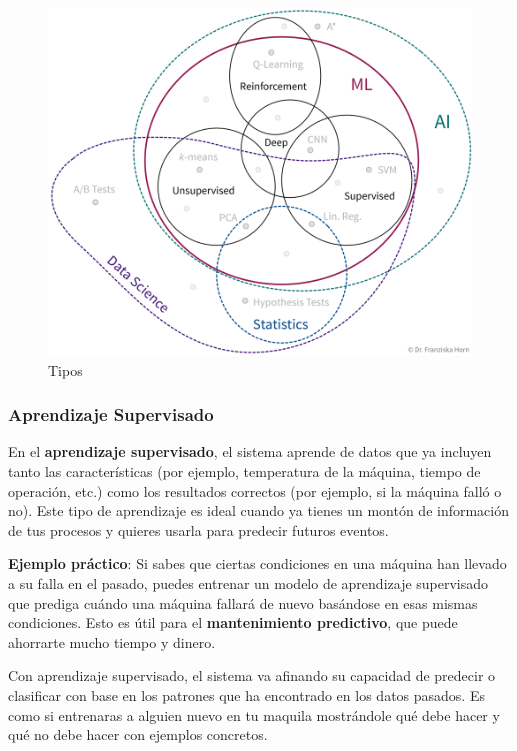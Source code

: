 \documentclass[
  10pt,
  letterpaper,
]{book}
\begin{document}
\begin{figure}[H]

{\centering \includegraphics{Img/imagen_21.jpg}

}

\caption{Tipos}

\end{figure}%

\subsubsection{\texorpdfstring{\textbf{Aprendizaje
Supervisado}}{Aprendizaje Supervisado}}\label{aprendizaje-supervisado-1}

En el \textbf{aprendizaje supervisado}, el sistema aprende de datos que
ya incluyen tanto las características (por ejemplo, temperatura de la
máquina, tiempo de operación, etc.) como los resultados correctos (por
ejemplo, si la máquina falló o no). Este tipo de aprendizaje es ideal
cuando ya tienes un montón de información de tus procesos y quieres
usarla para predecir futuros eventos.

\textbf{Ejemplo práctico}: Si sabes que ciertas condiciones en una
máquina han llevado a su falla en el pasado, puedes entrenar un modelo
de aprendizaje supervisado que prediga cuándo una máquina fallará de
nuevo basándose en esas mismas condiciones. Esto es útil para el
\textbf{mantenimiento predictivo}, que puede ahorrarte mucho tiempo y
dinero.

Con aprendizaje supervisado, el sistema va afinando su capacidad de
predecir o clasificar con base en los patrones que ha encontrado en los
datos pasados. Es como si entrenaras a alguien nuevo en tu maquila
mostrándole qué debe hacer y qué no debe hacer con ejemplos concretos.
\end{document}
